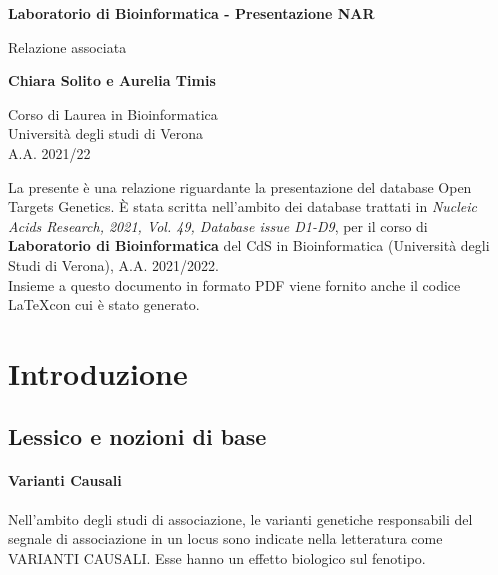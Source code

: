 \documentclass{article}
\begin{document}
\newcommand\tab[1][0.3cm]{\hspace*{#1}}


\begin{titlepage}
    \begin{center}
        \vspace*{1cm}
            
        \Huge
        \textbf{Laboratorio di Bioinformatica - Presentazione NAR}
            
        \vspace{0.5cm}
        \LARGE
        Relazione associata
            
        \vspace{1.5cm}
            
        \textbf{Chiara Solito e Aurelia Timis}

        \vspace{0.8cm}

            
        \Large
        Corso di Laurea in Bioinformatica\\
        Università degli studi di Verona\\
        A.A. 2021/22
            
    \end{center}
\end{titlepage}
La presente è una relazione riguardante la presentazione del database Open Targets Genetics. È stata scritta nell'ambito dei database trattati in \textit{Nucleic Acids Research, 2021, Vol. 49, Database issue D1-D9}, per il corso di \textbf{Laboratorio di Bioinformatica} del CdS in Bioinformatica (Università degli Studi di Verona), A.A. 2021/2022.\\
Insieme a questo documento in formato PDF viene fornito anche il codice \LaTeX  con cui è stato generato.
\tableofcontents
\thispagestyle{empty}
\newpage
\thispagestyle{empty}
\section{Introduzione}
\subsection{Lessico e nozioni di base}
\paragraph{Varianti Causali}Nell'ambito degli studi di associazione, le varianti genetiche responsabili del segnale di associazione in un locus sono indicate nella letteratura come VARIANTI CAUSALI. Esse hanno un effetto biologico sul fenotipo.
\end{document}
